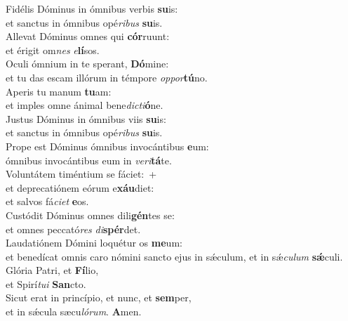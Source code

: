 \evenverse Fidélis Dóminus in ómnibus verbis \textbf{su}is:~\*\\
\evenverse et sanctus in ómnibus opé\textit{ri}\textit{bus} \textbf{su}is.\\
\oddverse Allevat Dóminus omnes qui \textbf{cór}ruunt:~\*\\
\oddverse et érigit om\textit{nes} \textit{e}\textbf{lí}sos.\\
\evenverse Oculi ómnium in te sperant, \textbf{Dó}mine:~\*\\
\evenverse et tu das escam illórum in témpore \textit{op}\textit{por}\textbf{tú}no.\\
\oddverse Aperis tu manum \textbf{tu}am:~\*\\
\oddverse et imples omne ánimal bene\textit{di}\textit{cti}\textbf{ó}ne.\\
\evenverse Justus Dóminus in ómnibus viis \textbf{su}is:~\*\\
\evenverse et sanctus in ómnibus opé\textit{ri}\textit{bus} \textbf{su}is.\\
\oddverse Prope est Dóminus ómnibus invocántibus \textbf{e}um:~\*\\
\oddverse ómnibus invocántibus eum in \textit{ve}\textit{ri}\textbf{tá}te.\\
\evenverse Voluntátem timéntium se fáciet:~+\\
\evenverse  et deprecatiónem eórum e\textbf{xáu}diet:~\*\\
\evenverse et salvos fá\textit{ci}\textit{et} \textbf{e}os.\\
\oddverse Custódit Dóminus omnes dili\textbf{gén}tes se:~\*\\
\oddverse et omnes peccató\textit{res} \textit{di}\textbf{spér}det.\\
\evenverse Laudatiónem Dómini loquétur os \textbf{me}um:~\*\\
\evenverse et benedícat omnis caro nómini sancto ejus in sǽculum, et in sǽ\textit{cu}\textit{lum} \textbf{sǽ}culi.\\
\oddverse Glória Patri, et \textbf{Fí}lio,~\*\\
\oddverse et Spirí\textit{tu}\textit{i} \textbf{San}cto.\\
\evenverse Sicut erat in princípio, et nunc, et \textbf{sem}per,~\*\\
\evenverse et in sǽcula sæcu\textit{ló}\textit{rum}. \textbf{A}men.\\
